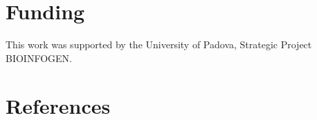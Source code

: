 \documentclass[review]{elsarticle}
\begin{document}
%
%
%
%
%
\section*{Funding}
This work was supported by the University of Padova, Strategic Project BIOINFOGEN.
\section*{References}


\end{document}
